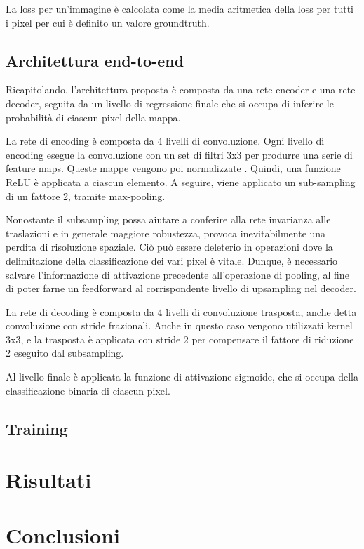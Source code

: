 \documentclass[12pt,a4paper]{report}
\begin{document}
La loss per un'immagine è calcolata come la media aritmetica della loss per tutti
i pixel per cui è definito un valore groundtruth.

\subsection{Architettura end-to-end}

Ricapitolando, l'architettura proposta è composta da una rete encoder e una
rete decoder, seguita da un livello di regressione finale che si occupa di
inferire le probabilità di ciascun pixel della mappa.

La rete di encoding è composta da 4 livelli di convoluzione.  Ogni livello di
encoding esegue la convoluzione con un set di filtri 3x3 per produrre una serie
di feature maps. Queste mappe vengono poi normalizzate
\cite{DBLP:journals/corr/ShelhamerLD16}. Quindi, una funzione ReLU è applicata
a ciascun elemento. A seguire, viene applicato un sub-sampling di un fattore 2,
tramite max-pooling. 

Nonostante il subsampling possa aiutare a conferire alla rete invarianza alle
traslazioni e in generale maggiore robustezza, provoca inevitabilmente una
perdita di risoluzione spaziale. Ciò può essere deleterio in operazioni dove
la delimitazione della classificazione dei vari pixel è vitale. Dunque, è
necessario salvare l'informazione di attivazione precedente all'operazione di
pooling, al fine di poter farne un feedforward al corrispondente livello di
upsampling nel decoder.

La rete di decoding è composta da 4 livelli di convoluzione trasposta, anche
detta convoluzione con stride frazionali. Anche in questo caso vengono
utilizzati kernel 3x3, e la trasposta è applicata con stride 2 per compensare
il fattore di riduzione 2 eseguito dal subsampling.

Al livello finale è applicata la funzione di attivazione sigmoide, che si 
occupa della classificazione binaria di ciascun pixel.

\subsection{Training}

\section{Risultati}
\section{Conclusioni}

\medskip
 
\printbibliography
\end{document}
